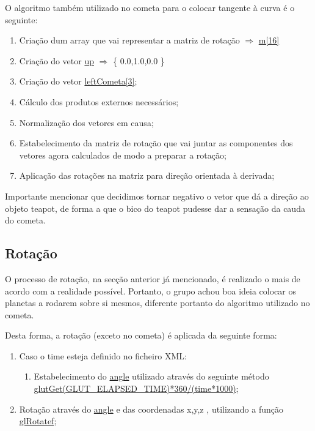 \documentclass[a4paper]{article}
\begin{document}
O algoritmo também utilizado no cometa para o colocar tangente à curva é o seguinte:

\ttfamily
\begin{enumerate}
  \item Criação dum array que vai representar a matriz de rotação $\Rightarrow$ \underline{m[16]}
  \item Criação do vetor \underline{up} $\Rightarrow$ \{ 0.0,1.0,0.0 \}
  \item Criação do vetor \underline{leftCometa[3]};
  \item Cálculo dos produtos externos necessários;
  \item Normalização dos vetores em causa;
  \item Estabelecimento da matriz de rotação que vai juntar as componentes dos vetores agora calculados de modo a preparar a rotação;
  \item Aplicação das rotações na matriz para direção orientada à derivada;
\end{enumerate}
\rmfamily

Importante mencionar que decidimos tornar negativo o vetor que dá a direção ao objeto teapot, de forma a que o bico do teapot pudesse dar a sensação da cauda do cometa.


\subsection{Rotação}
\label{sec:rotacao}

O processo de rotação, na secção anterior já mencionado, é realizado o mais de acordo com a realidade possível. Portanto, o grupo achou boa ideia colocar os planetas a rodarem sobre si mesmos, diferente portanto do algoritmo utilizado no cometa.

Desta forma, a rotação (exceto no cometa) é aplicada da seguinte forma:

\ttfamily
\begin{enumerate}
  \item Caso o time esteja definido no ficheiro XML:
  \begin{enumerate}
    \item Estabelecimento do \underline{angle} utilizado através do seguinte método \underline{glutGet(GLUT\_ELAPSED\_TIME)*360/(time*1000)};
  \end{enumerate}
  \item Rotação através do \underline{angle} e das coordenadas x,y,z , utilizando a função \underline{glRotatef};
\end{enumerate}
\rmfamily
\end{document}
